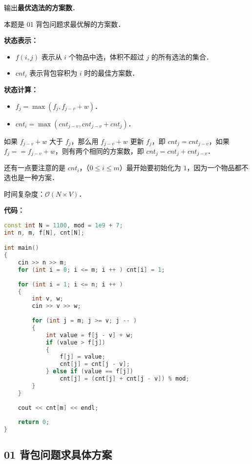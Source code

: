输出\textbf{最优选法的方案数}．

本题是 01 背包问题求最优解的方案数．

\textbf{状态表示：}

\begin{itemize}
\item $f(i, j)$ 表示从 $i$ 个物品中选，体积不超过 $j$ 的所有选法的集合．
\item $cnt_i$ 表示背包容积为 $i$ 时的最佳方案数．
\end{itemize}

\textbf{状态计算：}

\begin{itemize}
\item $f_j = \max(f_j, f_{j - v} + w)$．
\item $cnt_i = \max(cnt_{j - v}, cnt_{j - v} + cnt_j)$．
\end{itemize}

如果 $f_{j - v} + w$ 大于 $f_j$，那么用 $f_{j - v} + w$ 更新 $f_j$，即 $cnt_j = cnt_{j - v}$，如果 $f_j == f_{j - v} + w$，则有两个相同的方案数，即 $cnt_j = cnt_j + cnt_{j - v}$．

还有一点要注意的是 $cnt_i$，（$0 \leq i \leq m$）最开始要初始化为 $1$，因为一个物品都不选也是一种方案．

时间复杂度：$\mathcal{O}(N \times V)$．

\textbf{代码：}

\begin{lstlisting}[language=cpp]
const int N = 1100, mod = 1e9 + 7;
int n, m, f[N], cnt[N];

int main()
{
    cin >> n >> m;
    for (int i = 0; i <= m; i ++ ) cnt[i] = 1;
    
    for (int i = 1; i <= n; i ++ )
    {
        int v, w;
        cin >> v >> w;
        
        for (int j = m; j >= v; j -- )
        {
            int value = f[j - v] + w;
            if (value > f[j])
            {
                f[j] = value;
                cnt[j] = cnt[j - v];
            } else if (value == f[j]) 
                cnt[j] = (cnt[j] + cnt[j - v]) % mod;
        }
    }
    
    cout << cnt[m] << endl;
    
    return 0;
}
\end{lstlisting}

\subsection{01 背包问题求具体方案}

